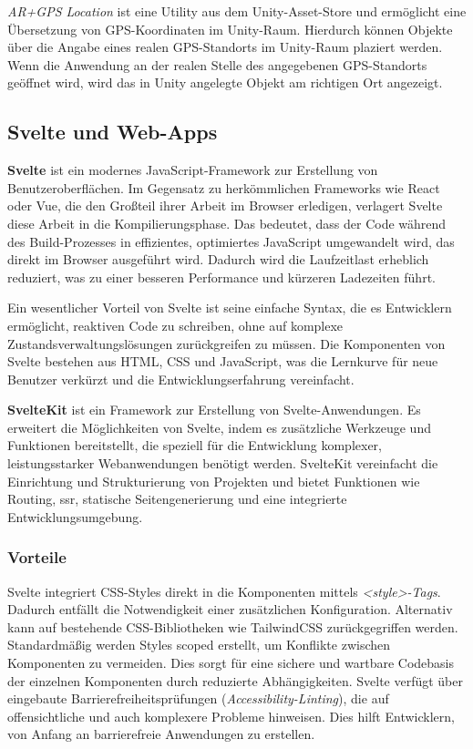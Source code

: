 \textit{AR+GPS Location} ist eine Utility aus dem Unity-Asset-Store und ermöglicht eine Übersetzung von GPS-Koordinaten im Unity-Raum. Hierdurch können Objekte über die Angabe eines realen GPS-Standorts im Unity-Raum plaziert werden. Wenn die Anwendung an der realen Stelle des angegebenen GPS-Standorts geöffnet wird, wird das in Unity angelegte Objekt am richtigen Ort angezeigt. \autocite{ArGpsLocation}

\subsection{Svelte und Web-Apps} \label{cha:grundlagen:swtech:svelte}

\textbf{Svelte} ist ein modernes JavaScript-Framework zur Erstellung von Benutzeroberflächen. Im Gegensatz zu herkömmlichen Frameworks wie React oder Vue, die den Großteil ihrer Arbeit im Browser erledigen, verlagert Svelte diese Arbeit in die Kompilierungsphase. Das bedeutet, dass der Code während des Build-Prozesses in effizientes, optimiertes JavaScript umgewandelt wird, das direkt im Browser ausgeführt wird. Dadurch wird die Laufzeitlast erheblich reduziert, was zu einer besseren Performance und kürzeren Ladezeiten führt. \autocite{Svelte2024}

Ein wesentlicher Vorteil von Svelte ist seine einfache Syntax, die es Entwicklern ermöglicht, reaktiven Code zu schreiben, ohne auf komplexe Zustandsverwaltungslösungen zurückgreifen zu müssen. Die Komponenten von Svelte bestehen aus HTML, CSS und JavaScript, was die Lernkurve für neue Benutzer verkürzt und die Entwicklungserfahrung vereinfacht. \autocite{Svelte2024}

\textbf{SvelteKit} ist ein Framework zur Erstellung von Svelte-Anwendungen. Es erweitert die Möglichkeiten von Svelte, indem es zusätzliche Werkzeuge und Funktionen bereitstellt, die speziell für die Entwicklung komplexer, leistungsstarker Webanwendungen benötigt werden. SvelteKit vereinfacht die Einrichtung und Strukturierung von Projekten und bietet Funktionen wie Routing, \ac{ssr}, statische Seitengenerierung und eine integrierte Entwicklungsumgebung. \autocite{Svelte2024}

\subsubsection{Vorteile}

Svelte integriert CSS-Styles direkt in die Komponenten mittels \textit{<style>-Tags}. Dadurch entfällt die Notwendigkeit einer zusätzlichen Konfiguration. Alternativ kann auf bestehende CSS-Bibliotheken wie TailwindCSS zurückgegriffen werden. Standardmäßig werden Styles scoped erstellt, um Konflikte zwischen Komponenten zu vermeiden. Dies sorgt für eine sichere und wartbare Codebasis der einzelnen Komponenten durch reduzierte Abhängigkeiten. Svelte verfügt über eingebaute Barrierefreiheitsprüfungen (\textit{Accessibility-Linting}), die auf offensichtliche und auch komplexere Probleme hinweisen. Dies hilft Entwicklern, von Anfang an barrierefreie Anwendungen zu erstellen. \autocite{SvelteExperienceBespoyasov}

